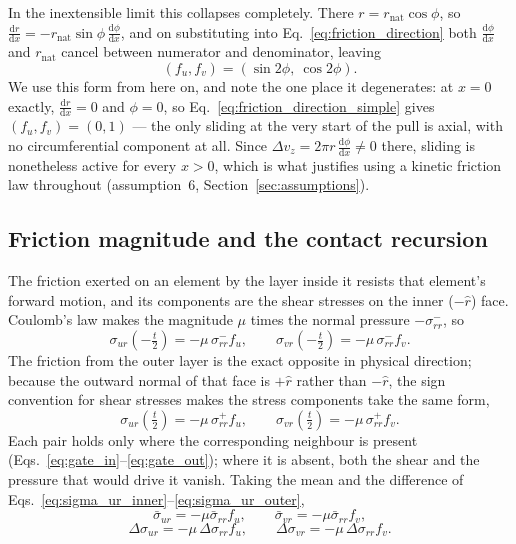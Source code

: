 \documentclass[11pt]{article}
\begin{document}
In the inextensible limit this collapses completely. There
$r = r_{\mathrm{nat}}\cos\phi$, so
$\frac{\mathrm d r}{\mathrm d x}
 = -r_{\mathrm{nat}}\sin\phi\,\frac{\mathrm d \phi}{\mathrm d x}$, and on
substituting into Eq.~\eqref{eq:friction_direction} both
$\frac{\mathrm d \phi}{\mathrm d x}$ and $r_{\mathrm{nat}}$ cancel between
numerator and denominator, leaving
\begin{equation}\label{eq:friction_direction_simple}
    \boxed{\;\left(f_u, f_v\right)
      = \left(\sin 2\phi,\ \cos 2\phi\right).\;}
\end{equation}
We use this form from here on, and note the one place it degenerates: at $x = 0$
exactly, $\frac{\mathrm d r}{\mathrm d x} = 0$ and $\phi = 0$, so
Eq.~\eqref{eq:friction_direction_simple} gives $(f_u, f_v) = (0,1)$ --- the only
sliding at the very start of the pull is axial, with no circumferential component
at all. Since $\Delta v_z = 2\pi r\,\frac{\mathrm d \phi}{\mathrm d x} \ne 0$
there, sliding is nonetheless active for every $x > 0$, which is what justifies
using a kinetic friction law throughout (assumption~6,
Section~\ref{sec:assumptions}).

\subsection{Friction magnitude and the contact recursion}\label{sec:friction_magnitude}
The friction exerted on an element by the layer inside it resists that element's
forward motion, and its components are the shear stresses on the inner
($-\hat r$) face. Coulomb's law makes the magnitude $\mu$ times the normal
pressure $-\sigma_{rr}^{-}$, so
\begin{equation}\label{eq:sigma_ur_inner}
    \sigma_{ur}\!\left(-\tfrac{t}{2}\right) = -\mu\,\sigma_{rr}^{-}f_u,
    \qquad
    \sigma_{vr}\!\left(-\tfrac{t}{2}\right) = -\mu\,\sigma_{rr}^{-}f_v.
\end{equation}
The friction from the outer layer is the exact opposite in physical direction;
because the outward normal of that face is $+\hat r$ rather than $-\hat r$, the
sign convention for shear stresses makes the stress components take the same
form,
\begin{equation}\label{eq:sigma_ur_outer}
    \sigma_{ur}\!\left(\tfrac{t}{2}\right) = -\mu\,\sigma_{rr}^{+}f_u,
    \qquad
    \sigma_{vr}\!\left(\tfrac{t}{2}\right) = -\mu\,\sigma_{rr}^{+}f_v.
\end{equation}
Each pair holds only where the corresponding neighbour is present
(Eqs.~\ref{eq:gate_in}--\ref{eq:gate_out}); where it is absent, both the shear
and the pressure that would drive it vanish. Taking the mean and the difference
of Eqs.~\eqref{eq:sigma_ur_inner}--\eqref{eq:sigma_ur_outer},
\begin{equation}\label{eq:bar_shear}
    \boxed{\;\bar\sigma_{ur} = -\mu \bar\sigma_{rr}f_u, \qquad
    \bar\sigma_{vr} = -\mu \bar\sigma_{rr}f_v,\;}
\end{equation}
\begin{equation}\label{eq:delta_shear}
    \Delta\sigma_{ur} = -\mu\,\Delta\sigma_{rr}f_u, \qquad
    \Delta\sigma_{vr} = -\mu\,\Delta\sigma_{rr}f_v.
\end{equation}
\end{document}

